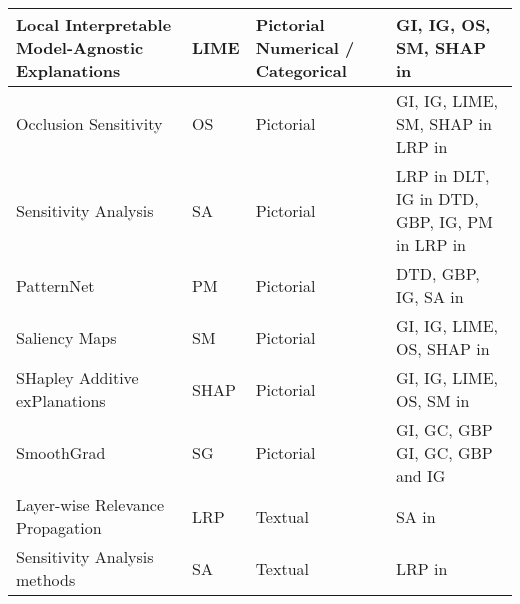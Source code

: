 \documentclass[final,1p,times]{elsarticle}
\begin{document}
\begin{table}[htbp]
\begin{tabular}{m{4.9cm} m{1cm} m{1.5cm} m{4.4cm}}
    \hline
    Local Interpretable Model-Agnostic Explanations \cite{ribeiro2016should} & LIME & Pictorial \newline Numerical / Categorical & GI, IG, OS, SM, SHAP in \cite{alvarez2018robustness}\\
    \hline
    Occlusion Sensitivity \cite{zeiler2014visualizing} & OS & Pictorial & GI, IG, LIME, SM, SHAP in \cite{alvarez2018robustness} \newline LRP in \cite{binder2016analyzing} \\
    \hline
    Sensitivity Analysis \cite{baehrens2010explain} & SA & Pictorial & LRP in \cite{binder2016analyzing} \newline DLT, IG in \cite{ghorbani2017interpretation} \newline DTD, GBP, IG, PM in \cite{kindermans2017reliability} \newline LRP in \cite{samek2017evaluating, samek2017explainable}\\
    \hline
    PatternNet \cite{kindermans2018learning} & PM & Pictorial & DTD, GBP, IG, SA in \cite{kindermans2017reliability} \\
    \hline
    Saliency Maps \cite{simonyan2014deep} & SM & Pictorial & GI, IG, LIME, OS, SHAP in \cite{alvarez2018robustness}\\
    \hline
    SHapley Additive exPlanations \cite{lundberg2017unified} & SHAP & Pictorial & GI, IG, LIME, OS, SM in \cite{alvarez2018robustness}\\
    \hline
    SmoothGrad \cite{smilkov2017smoothgrad} & SG & Pictorial & GI, GC, GBP \cite{adebayo2018local} \newline GI, GC, GBP and IG \cite{adebayo2018sanity}\\
    \hline
    Layer-wise Relevance Propagation  \cite{bach2015pixel} & LRP & Textual & SA in \cite{arras2016explaining,samek2017explainable} \\
    \hline
    Sensitivity Analysis methods \cite{baehrens2010explain} & SA & Textual & LRP in \cite{arras2016explaining,samek2017explainable} \\
  \hline
\end{tabular}
\end{table}
\end{document}
